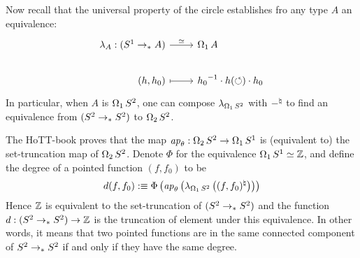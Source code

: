 \documentclass[english,a4]{article}
\begin{document}
Now recall that the universal property of the circle establishes fro
any type $A$ an equivalence:
\begin{equation}
  \label{eq:25}
  \begin{tikzcd}[%
    /tikz/column 1/.append style={anchor=base east},%
    /tikz/column 2/.append style={anchor=base west}]
    \lambda_{A}: (\Sc \ptdto A) \rar["\weq"] & \loopspace 1 A
    \\
    (h,h_0) \rar[mapsto] & \inv{h_0} \cdot h(\Sloop)\cdot h_0
  \end{tikzcd}
\end{equation}
In particular, when $A$ is $\operatorname{\Omega_{1}} S^2$, one can compose
$\lambda_{\operatorname{\Omega_{1}} S^2}$ with $\mathord{-}^\natural$ to find an
equivalence from $(S^2 \to_\ast S^2)$ to $\operatorname{\Omega_{2}} S^2$.

The HoTT-book proves that the map
$\mathop{{\it ap}_{\theta}}:\operatorname{\Omega_{2}} S^2 \to \operatorname{\Omega_{1}} {S^1}$ is (equivalent to)
the set-truncation map of $\operatorname{\Omega_{2}} S^2$. Denote $\Phi$ for the
equivalence $\operatorname{\Omega_{1}} {S^1} \simeq \mathbb{Z}$, and define the degree of a
pointed function $(f,f_0)$ to be
\begin{equation}
  \label{eq:28}
  d(f,f_0) \mathrel{\hbox{:}\mkern-5mu\equiv} \Phi\left(\mathop{{\it ap}_{\theta}}\left(
      \lambda_{\operatorname{\Omega_{1}} S^2}\left((f,f_0)^\natural\right)
    \right)\right)
\end{equation}
Hence $\mathbb{Z}$ is equivalent to the set-truncation of $(S^2 \to_\ast S^2)$
and the function $d: (S^2 \to_\ast S^2) \to \mathbb{Z}$ is the truncation of
element under this equivalence. In other words, it means that two
pointed functions are in the same connected component of
$S^2 \to_\ast S^2$ if and only if they have the same degree.
\end{document}

